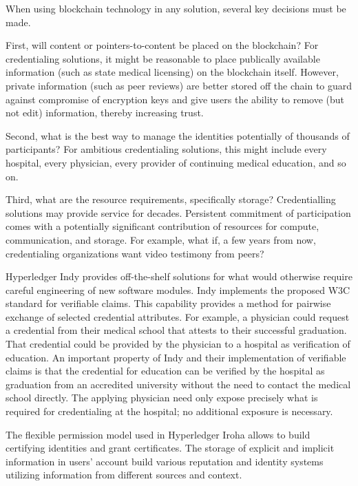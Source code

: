 When using blockchain technology in any solution, several key decisions must be made.

First, will content or pointers-to-content be placed on the blockchain?  For credentialing
solutions, it might be reasonable to place publically available information (such as state medical
licensing) on the blockchain itself.  However, private information (such as peer reviews) are better
stored off the chain to guard against compromise of encryption keys and give users the ability to
remove (but not edit) information, thereby increasing trust.

Second, what is the best way to manage the identities potentially of thousands of participants?  For
ambitious credentialing solutions, this might include every hospital, every physician, every
provider of continuing medical education, and so on.

Third, what are the resource requirements, specifically storage? Credentialling solutions may
provide service for decades. Persistent commitment of participation comes with a potentially
significant contribution of resources for compute, communication, and storage. For example, what if,
a few years from now, credentialing organizations want video testimony from peers?

Hyperledger Indy provides off-the-shelf solutions for what would otherwise require careful
engineering of new software modules. Indy implements the proposed W3C standard for verifiable
claims. This capability provides a method for pairwise exchange of selected credential
attributes. For example, a physician could request a credential from their medical school that
attests to their successful graduation. That credential could be provided by the physician to a
hospital as verification of education. An important property of Indy and their implementation of
verifiable claims is that the credential for education can be verified by the hospital as
graduation from an accredited university without the need to contact the medical school
directly. The applying physician need only expose precisely what is required for credentialing at
the hospital; no additional exposure is necessary.

The flexible permission model used in Hyperledger Iroha allows to build certifying identities and grant certificates. The storage of explicit and implicit information in users' account build various reputation and identity systems utilizing information from different sources and context.     
